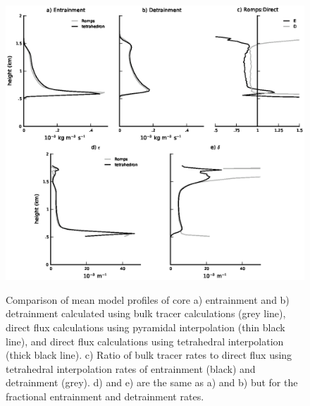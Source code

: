 \documentclass[12pt]{article}
\begin{document}
\begin{figure}[t]
  \noindent\includegraphics[width=40pc,angle=0]{./figures/direct_vs_romps}\\
  \caption{Comparison of mean model profiles of core a) entrainment and b) 
detrainment calculated using bulk tracer calculations (grey line), direct flux
calculations using pyramidal interpolation (thin black line), and direct flux
calculations using tetrahedral interpolation (thick black line).  c) Ratio of 
bulk tracer rates to direct flux using tetrahedral interpolation rates of
entrainment (black) and detrainment (grey).  d) and e) are the same as 
a) and b) but for the fractional entrainment and detrainment rates.}
\label{fig:direct_vs_tracer}
\end{figure}
\end{document}
